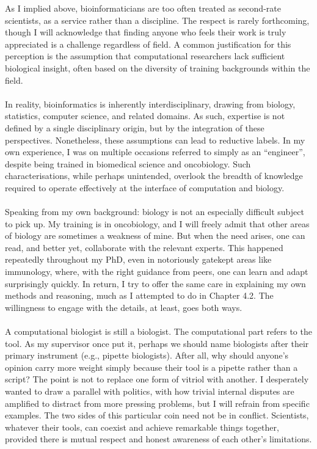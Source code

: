 As I implied above, bioinformaticians are too often treated as second-rate scientists, as a service rather than a discipline. The respect is rarely forthcoming, though I will acknowledge that finding anyone who feels their work is truly appreciated is a challenge regardless of field. A common justification for this perception is the assumption that computational researchers lack sufficient biological insight, often based on the diversity of training backgrounds within the field.
\\
\\
In reality, bioinformatics is inherently interdisciplinary, drawing from biology, statistics, computer science, and related domains. As such, expertise is not defined by a single disciplinary origin, but by the integration of these perspectives. Nonetheless, these assumptions can lead to reductive labels. In my own experience, I was on multiple occasions referred to simply as an “engineer”, despite being trained in biomedical science and oncobiology. Such characterisations, while perhaps unintended, overlook the breadth of knowledge required to operate effectively at the interface of computation and biology.
\\
\\
Speaking from my own background: biology is not an especially difficult subject to pick up. My training is in oncobiology, and I will freely admit that other areas of biology are sometimes a weakness of mine. But when the need arises, one can read, and better yet, collaborate with the relevant experts. This happened repeatedly throughout my PhD, even in notoriously gatekept areas like immunology, where, with the right guidance from peers, one can learn and adapt surprisingly quickly. In return, I try to offer the same care in explaining my own methods and reasoning, much as I attempted to do in Chapter 4.2. The willingness to engage with the details, at least, goes both ways.
\\
\\
A computational biologist is still a biologist. The computational part refers to the tool. As my supervisor once put it, perhaps we should name biologists after their primary instrument (e.g., pipette biologists). After all, why should anyone's opinion carry more weight simply because their tool is a pipette rather than a script? The point is not to replace one form of vitriol with another. I desperately wanted to draw a parallel with politics, with how trivial internal disputes are amplified to distract from more pressing problems, but I will refrain from specific examples. The two sides of this particular coin need not be in conflict. Scientists, whatever their tools, can coexist and achieve remarkable things together, provided there is mutual respect and honest awareness of each other's limitations.
